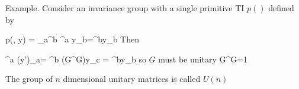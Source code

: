 Example. Consider
an invariance group
with a single
primitive TI $p()$ defined by 

\beq
p(, y) = \delta_a^b ^a y_b=^by_b
\eeq
Then

\beq
{}^a (y')_a=
^b (G^\dagger G)y_c = ^by_b
\eeq
so $G$ must be unitary
\beq
G^\dagger G=1
\eeq
 
The group of $n$ dimensional unitary matrices is called $U(n)$



